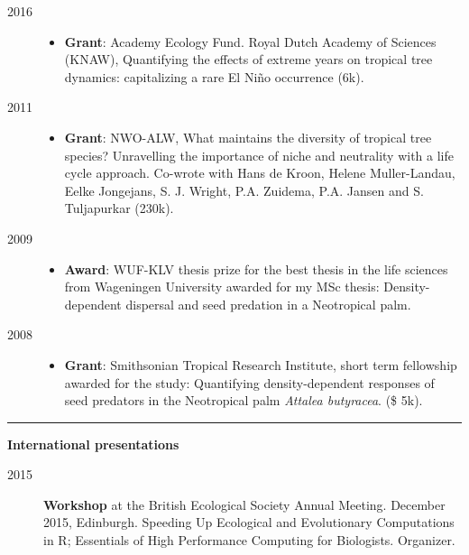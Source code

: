 \documentclass[b5paper,justified]{tufte-book} %
\begin{document}
\begin{fullwidth}
\begin{description}
\item[2016]
\begin{itemize}

\item
  \textbf{Grant}: Academy Ecology Fund. Royal Dutch Academy of Sciences
  (KNAW), Quantifying the effects of extreme years on tropical tree
  dynamics: capitalizing a rare El Ni\~no occurrence (6k).
\end{itemize}
\item[2011]
\begin{itemize}

\item
  \textbf{Grant}: NWO-ALW, What maintains the diversity of tropical tree
  species? Unravelling the importance of niche and neutrality with a
  life cycle approach. Co-wrote with Hans de Kroon, Helene
  Muller-Landau, Eelke Jongejans, S. J. Wright, P.A. Zuidema, P.A.
  Jansen and S. Tuljapurkar (230k).
\end{itemize}
\item[2009]
\begin{itemize}

\item
  \textbf{Award}: WUF-KLV thesis prize for the best thesis in the life
  sciences from Wageningen University awarded for my MSc thesis:
  Density-dependent dispersal and seed predation in a Neotropical palm.
\end{itemize}
\item[2008]
\begin{itemize}

\item
  \textbf{Grant}: Smithsonian Tropical Research Institute, short term
  fellowship awarded for the study: Quantifying density-dependent
  responses of seed predators in the Neotropical palm \textit{Attalea butyracea}.
  (\$ 5k).
\end{itemize}
\end{description}

\begin{center}\rule{0.5\linewidth}{\linethickness}\end{center}

\vspace{1cm}
\Large \textbf{International presentations}
\vspace{1cm}
\footnotesize
\begin{description}

\item[2015]
\textbf{Workshop} at the British Ecological Society Annual Meeting.
December 2015, Edinburgh. Speeding Up Ecological and Evolutionary
Computations in R; Essentials of High Performance Computing for
Biologists. Organizer.


\end{description}
\end{fullwidth}
\end{document}
